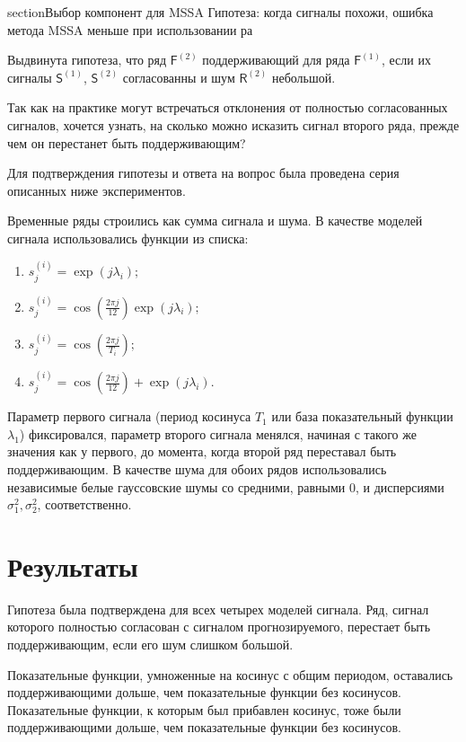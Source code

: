 \documentclass[specialist, substylefile = spbureport.rtx,
    subf,href,colorlinks=true, 12pt]{disser}
\newcommand{\F}{\mathsf{F}}
\newcommand{\sfS}{\mathsf{S}}
\newcommand{\sfR}{\mathsf{R}}
\begin{document}
    section{Выбор компонент для MSSA}
        Гипотеза: когда сигналы похожи, ошибка метода MSSA меньше при использовании ра







        Выдвинута гипотеза, что ряд $\F^{(2)}$ поддерживающий для ряда $\F^{(1)}$, если их сигналы $\sfS^{(1)}$, $\sfS^{(2)}$ согласованны и шум $\sfR^{(2)}$ небольшой.

        Так как на практике могут встречаться отклонения от полностью согласованных сигналов, хочется узнать, на сколько можно исказить сигнал второго ряда, прежде чем он перестанет быть поддерживающим?

        Для подтверждения гипотезы и ответа на вопрос была проведена серия описанных ниже экспериментов.

        Временные ряды строились как сумма сигнала и шума.
        В качестве моделей сигнала использовались функции из списка:
            \begin{enumerate}
                \item $s^{(i)}_j = \exp(j\lambda_i);$
                \item $s^{(i)}_j = \cos(\frac{2\pi j}{12})\exp(j\lambda_i);$
                \item $s^{(i)}_j = \cos(\frac{2\pi j}{T_i});$
                \item $s^{(i)}_j = \cos(\frac{2\pi j}{12}) + \exp(j\lambda_i).$
            \end{enumerate}
        Параметр первого сигнала (период косинуса $T_1$ или база показательный функции $\lambda_1$) фиксировался, параметр второго сигнала менялся, начиная с такого же значения как у первого, до момента, когда второй ряд переставал быть поддерживающим.
        В качестве шума для обоих рядов использовались независимые белые гауссовские шумы со средними, равными 0, и дисперсиями $\sigma_1^2, \sigma_2^2$, соответственно.



    \section{Результаты}
        
        Гипотеза была подтверждена для всех четырех моделей сигнала. Ряд, сигнал которого полностью согласован с сигналом прогнозируемого, перестает быть поддерживающим, если его шум слишком большой.

        Показательные функции, умноженные на косинус с общим периодом, оставались поддерживающими дольше, чем показательные функции без косинусов.
        Показательные функции, к которым был прибавлен косинус, тоже были поддерживающими дольше, чем показательные функции без косинусов.
        
\end{document}
